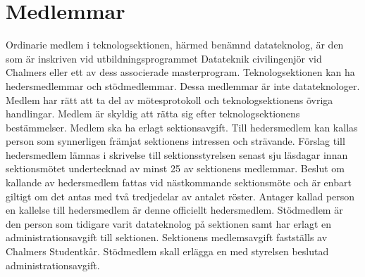 \documentclass[a4paper]{dtek}
\begin{document}
\section{Medlemmar}
\para[Datateknologer] Ordinarie medlem i teknologsektionen, härmed benämnd datateknolog, är den som är inskriven vid utbildningsprogrammet Datateknik civilingenjör vid Chalmers eller ett av dess associerade masterprogram. 
\para Teknologsektionen kan ha hedersmedlemmar och stödmedlemmar.
\stycke Dessa medlemmar är inte datateknologer.
\para[Rättigheter] Medlem har rätt att ta del av mötesprotokoll och teknologsektionens övriga handlingar.
\para[Skyldigheter] Medlem är skyldig att rätta sig efter teknologsektionens bestämmelser.
\para Medlem ska ha erlagt sektionsavgift.
\para[Hedersmedlem] Till hedersmedlem kan kallas person som synnerligen främjat sektionens intressen och strävande.
\para Förslag till hedersmedlem lämnas i skrivelse till sektionsstyrelsen senast sju läsdagar innan sektionsmötet undertecknad av minst 25 av sektionens medlemmar.
\para Beslut om kallande av hedersmedlem fattas vid nästkommande sektionsmöte och är enbart giltigt om det antas med två tredjedelar av antalet röster.
\para Antager kallad person en kallelse till hedersmedlem är denne officiellt hedersmedlem.
\para[Stödmedlem] Stödmedlem är den person som tidigare varit datateknolog på sektionen samt har erlagt en administrationsavgift till sektionen.
\para[Avgifter] Sektionens medlemsavgift fastställs av Chalmers Studentkår.
\para Stödmedlem skall erlägga en med styrelsen beslutad administrationsavgift.
\end{document}
